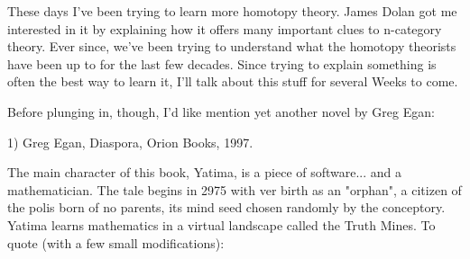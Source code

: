 

These days I've been trying to learn more homotopy theory.  James Dolan
got me interested in it by explaining how it offers many important clues
to n-category theory.  Ever since, we've been trying to understand what
the homotopy theorists have been up to for the last few decades.  Since
trying to explain something is often the best way to learn it, I'll talk
about this stuff for several Weeks to come.

Before plunging in, though, I'd like mention yet another novel by Greg
Egan:

1) Greg Egan, Diaspora, Orion Books, 1997.

The main character of this book, Yatima, is a piece of software... and a
mathematician.  The tale begins in 2975 with ver birth as an "orphan", a
citizen of the polis born of no parents, its mind seed chosen randomly
by the conceptory.  Yatima learns mathematics in a virtual landscape
called the Truth Mines.  To quote (with a few small modifications):
